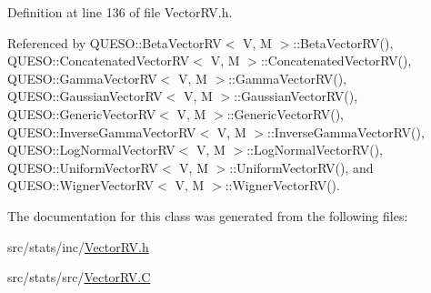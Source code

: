 Definition at line 136 of file Vector\-R\-V.\-h.



Referenced by Q\-U\-E\-S\-O\-::\-Beta\-Vector\-R\-V$<$ V, M $>$\-::\-Beta\-Vector\-R\-V(), Q\-U\-E\-S\-O\-::\-Concatenated\-Vector\-R\-V$<$ V, M $>$\-::\-Concatenated\-Vector\-R\-V(), Q\-U\-E\-S\-O\-::\-Gamma\-Vector\-R\-V$<$ V, M $>$\-::\-Gamma\-Vector\-R\-V(), Q\-U\-E\-S\-O\-::\-Gaussian\-Vector\-R\-V$<$ V, M $>$\-::\-Gaussian\-Vector\-R\-V(), Q\-U\-E\-S\-O\-::\-Generic\-Vector\-R\-V$<$ V, M $>$\-::\-Generic\-Vector\-R\-V(), Q\-U\-E\-S\-O\-::\-Inverse\-Gamma\-Vector\-R\-V$<$ V, M $>$\-::\-Inverse\-Gamma\-Vector\-R\-V(), Q\-U\-E\-S\-O\-::\-Log\-Normal\-Vector\-R\-V$<$ V, M $>$\-::\-Log\-Normal\-Vector\-R\-V(), Q\-U\-E\-S\-O\-::\-Uniform\-Vector\-R\-V$<$ V, M $>$\-::\-Uniform\-Vector\-R\-V(), and Q\-U\-E\-S\-O\-::\-Wigner\-Vector\-R\-V$<$ V, M $>$\-::\-Wigner\-Vector\-R\-V().



The documentation for this class was generated from the following files\-:\begin{DoxyCompactItemize}
\item 
src/stats/inc/\hyperlink{_vector_r_v_8h}{Vector\-R\-V.\-h}\item 
src/stats/src/\hyperlink{_vector_r_v_8_c}{Vector\-R\-V.\-C}\end{DoxyCompactItemize}
